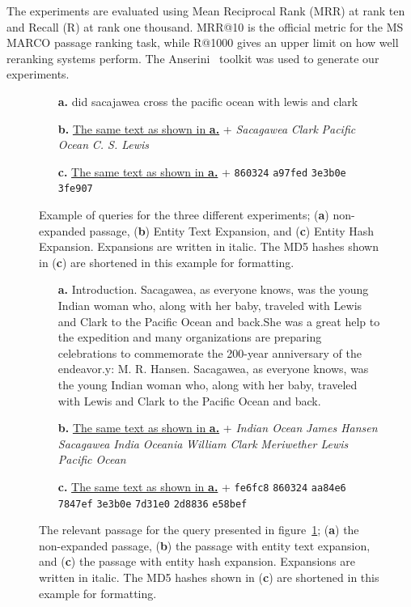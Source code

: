 The experiments are evaluated using Mean Reciprocal Rank (MRR) at rank ten and Recall (R) at rank one thousand. MRR@10 is the official metric for the MS MARCO passage ranking task, while R@1000 gives an upper limit on how well reranking systems perform. The Anserini~\citep{anserini} toolkit was used to generate our experiments. 
\begin{figure}[!t]
\centering
\begin{itemize}
	\item[\textbf{a.}] did sacajawea cross the pacific ocean with lewis and clark
	\item[\textbf{b.}] \underline{The same text as shown in \textbf{a.}} + \emph{Sacagawea} \emph{Clark} \emph{Pacific Ocean} \emph{C. S. Lewis}
	\item[\textbf{c.}] \underline{The same text as shown in \textbf{a.}} + \texttt{860324} \texttt{a97fed} \texttt{3e3b0e} \texttt{3fe907}
\end{itemize}
\caption{Example of queries for the three different experiments; (\textbf{a}) non-expanded passage, (\textbf{b}) Entity Text Expansion, and (\textbf{c}) Entity Hash Expansion. Expansions are written in italic. The MD5 hashes shown in (\textbf{c}) are shortened in this example for formatting.}
\label{fig:exp_queries}
\end{figure}

\begin{figure}[!t]
\centering
\begin{itemize}
	\item[\textbf{a.}] Introduction. Sacagawea, as everyone knows, was the young Indian woman who, along with her baby, traveled with Lewis and Clark to the Pacific Ocean and back.She was a great help to the expedition and many organizations are preparing celebrations to commemorate the 200-year anniversary of the endeavor.y: M. R. Hansen. Sacagawea, as everyone knows, was the young Indian woman who, along with her baby, traveled with Lewis and Clark to the Pacific Ocean and back.
	\item[\textbf{b.}] \underline{The same text as shown in \textbf{a.}} + \emph{Indian Ocean} \emph{James Hansen} \emph{Sacagawea} \emph{India} \emph{Oceania} \emph{William Clark} \emph{Meriwether Lewis} \emph{Pacific Ocean}
	\item[\textbf{c.}] \underline{The same text as shown in \textbf{a.}} + \texttt{fe6fc8} \texttt{860324} \texttt{aa84e6} \texttt{7847ef} \texttt{3e3b0e} \texttt{7d31e0} \texttt{2d8836} \texttt{e58bef}
\end{itemize}
\caption{The relevant passage for the query presented in figure~\ref{fig:exp_queries}; (\textbf{a}) the non-expanded passage, (\textbf{b}) the passage with entity text expansion, and (\textbf{c}) the passage with entity hash expansion. Expansions are written in italic. The MD5 hashes shown in (\textbf{c}) are shortened in this example for formatting.}
\label{fig:exp_passage}
\end{figure}

